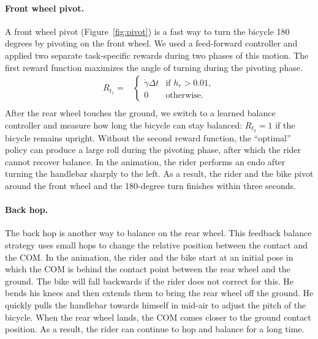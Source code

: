 \paragraph{Front wheel pivot.} A front wheel pivot (Figure~\ref{fig:pivot}) is a fast way to turn the bicycle 180 degrees by pivoting on the front wheel. We used a feed-forward controller and applied two separate task-specific rewards during two phases of this motion. The first reward function maximizes the angle of turning during the pivoting phase.
\begin {displaymath}
\begin{array}{ll}
R_{t_1} = & \left\{ \begin{array}{ll}
\dot{\gamma} \Delta t & \textrm{if }h_r > 0.01,\\
0 & \textrm{otherwise.}
\end{array} \right. \\
\end{array}
\end {displaymath}
After the rear wheel touches the ground, we switch to a learned balance controller and measure how long the bicycle can stay balanced: $R_{t_2}=1$ if the bicycle remains upright. Without the second reward function, the ``optimal'' policy can produce a large roll during the pivoting phase, after which the rider cannot recover balance. In the animation, the rider performs an endo after turning the handlebar sharply to the left. As a result, the rider and the bike pivot around the front wheel and the 180-degree turn finishes within three seconds.

\paragraph {Back hop.} The back hop is another way to balance on the rear wheel. This feedback balance strategy uses small hops to change the relative position between the contact and the COM. In the animation, the rider and the bike start at an initial pose in which the COM is behind the contact point between the rear wheel and the ground. The bike will fall backwards if the rider does not correct for this. He bends his knees and then extends them to bring the rear wheel off the ground. He quickly pulls the handlebar towards himself in mid-air to adjust the pitch of the bicycle. When the rear wheel lands, the COM comes closer to the ground contact position. As a result, the rider can continue to hop and balance for a long time.

